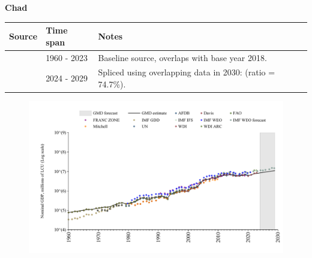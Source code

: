 \documentclass[12pt,a4paper,landscape]{article}
\begin{document}
\begin{adjustbox}{max totalsize={\paperwidth}{\paperheight},center}
\begin{minipage}[t][\textheight][t]{\textwidth}
\vspace*{0.5cm}
{}
\begin{center}
{\Large\bfseries Chad}
\end{center}
\vspace{0.5cm}
\begin{table}[H]
\centering
\small
\begin{tabular}{|l|l|l|}
\hline
\textbf{Source} & \textbf{Time span} & \textbf{Notes} \\
\hline
\rowcolor{white}\cite{WDI}& 1960 - 2023 &Baseline source, overlaps with base year 2018.\\
\rowcolor{lightgray}\cite{IMF_WEO_forecast}& 2024 - 2029 &Spliced using overlapping data in 2030: (ratio = 74.7\%).\\
\hline
\end{tabular}
\end{table}
\begin{figure}[H]
\centering
\includegraphics[width=\textwidth,height=0.6\textheight,keepaspectratio]{graphs/TCD_nGDP.pdf}
\end{figure}
\end{minipage}
\end{adjustbox}
\end{document}
